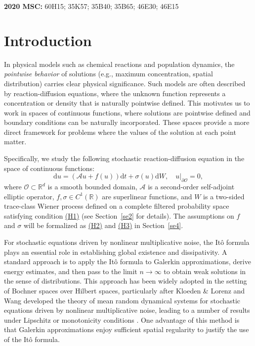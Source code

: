 \documentclass[10pt]{article}
\numberwithin{figure}{section}
\numberwithin{equation}{section}
\newcommand{\cA}{{\mathcal A}}
\newcommand{\0}{{\theta}}
\begin{document}
\noindent\textbf{2020 MSC:} 60H15; 35K57; 35B40; 35B65; 46E30; 46E15
\section{Introduction}
In physical models such as chemical reactions and population dynamics, the {\sl pointwise behavior} of solutions (e.g., maximum concentration, spatial distribution) carries clear physical significance. Such models are often described by reaction-diffusion equations, where the unknown function represents a concentration or density that is naturally pointwise defined. This motivates us to work in spaces of continuous functions, where solutions are pointwise defined and boundary conditions can be naturally incorporated. These spaces provide a more direct framework for problems where the values of the solution at each point matter.

Specifically, we study the following stochastic reaction-diffusion equation in the space of continuous functions:
\begin{equation}\label{eq1}
    \mathrm{d}u = \left(\cA u + f(u)\right)\mathrm{d}t + \sigma(u)\mathrm{d}W, \quad u|_{\partial\mathcal{O}} = 0,
\end{equation}
where $\mathcal{O} \subset \mathbb{R}^d$ is a smooth bounded domain,  $\cA$ is a second-order self-adjoint elliptic operator, $f,\sigma\in C^1(\mathbb{R})$ are superlinear functions, and $W$ is a two-sided trace-class Wiener process defined on a complete filtered probability space satisfying condition \hyperref[H1]{(H1)} (see Section~\ref{se2} for details). The assumptions on $f$ and $\sigma$ will be formalized as \hyperref[H2]{(H2)} and \hyperref[H3]{(H3)} in Section~\ref{se4}.

For stochastic equations driven by nonlinear multiplicative noise, the It\^o formula plays an essential role in establishing global existence and dissipativity. A standard approach is to apply the It\^o formula to Galerkin approximations, derive energy estimates, and then pass to the limit $n\to\infty$ to obtain weak solutions in the sense of distributions. This approach has been widely adopted in the setting of Bochner spaces over Hilbert spaces,  particularly after  Kloeden \& Lorenz \cite{KL1} and Wang   \cite{WBX} developed the theory of mean random dynamical systems for stochastic equations driven by nonlinear multiplicative noise, leading to a number of results under Lipschitz or monotonicity conditions \cite{CW,Gu2,KL2, QSW,WCT,WBX',WZ,WK}. One advantage of this method is that Galerkin approximations enjoy sufficient spatial regularity to justify the use of the It\^o formula.
\end{document}
